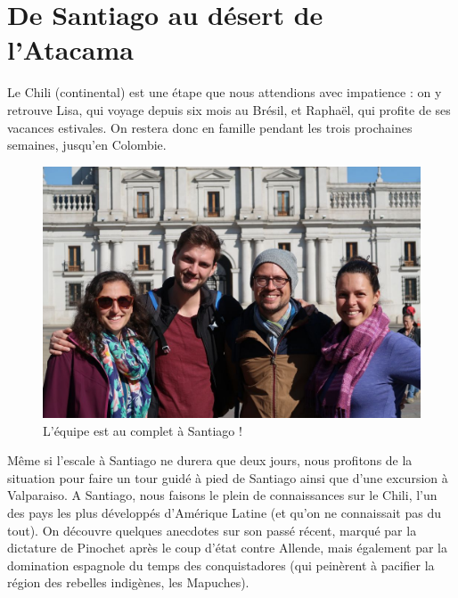 \hypertarget{de-santiago-au-duxe9sert-de-latacama}{%
\section{De Santiago au désert de
l'Atacama}\label{de-santiago-au-duxe9sert-de-latacama}}

Le Chili (continental) est une étape que nous attendions avec impatience
: on y retrouve Lisa, qui voyage depuis six mois au Brésil, et Raphaël,
qui profite de ses vacances estivales. On restera donc en famille
pendant les trois prochaines semaines, jusqu'en Colombie.

\begin{figure}
\centering
\includegraphics{images/20180904_teamsantiago.JPG}
\caption{L'équipe est au complet à Santiago !}
\end{figure}

Même si l'escale à Santiago ne durera que deux jours, nous profitons de
la situation pour faire un tour guidé à pied de Santiago ainsi que d'une
excursion à Valparaiso. A Santiago, nous faisons le plein de
connaissances sur le Chili, l'un des pays les plus développés d'Amérique
Latine (et qu'on ne connaissait pas du tout). On découvre quelques
anecdotes sur son passé récent, marqué par la dictature de Pinochet
après le coup d'état contre Allende, mais également par la domination
espagnole du temps des conquistadores (qui peinèrent à pacifier la
région des rebelles indigènes, les Mapuches).

